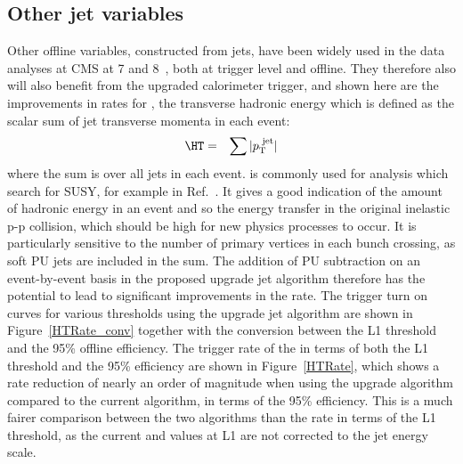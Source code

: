 \subsection{Other jet variables}
Other offline variables, constructed from jets, have been widely used in the data analyses at \ac{CMS} at 7 and 8~\TeV, both at trigger level and offline.
They therefore also will also benefit from the upgraded calorimeter trigger, and shown here are the improvements in rates for \HT, the transverse hadronic energy which is defined as the scalar sum of jet transverse momenta in each event:
%
\begin{eqnarray}
\HT &=& \sum{|\pt^{\text{ jet}}|} %
\end{eqnarray}  
where the sum is over all jets in each event.
\HT is commonly used for analysis which search for \ac{SUSY}, for example in Ref.~\cite{alphaT}.
It gives a good indication of the amount of hadronic energy in an event and so the energy transfer in the original inelastic p-p collision, which should be high for new physics processes to occur.
It is particularly sensitive to the number of primary vertices in each bunch crossing, as soft \ac{PU} jets are included in the sum.
The addition of \ac{PU} subtraction on an event-by-event basis in the proposed upgrade jet algorithm therefore has the potential to lead to significant improvements in the rate.
The trigger turn on curves for various \HT thresholds using the upgrade jet algorithm are shown in Figure~\ref{HTRate_conv} together with the conversion between the \ac{L1} threshold and the 95\% offline efficiency. 
The trigger rate of the \HT in terms of both the \ac{L1} threshold and the 95\% efficiency are shown in Figure~\ref{HTRate}, which shows a rate reduction of nearly an order of magnitude when using the upgrade algorithm compared to the current algorithm, in terms of the 95\% efficiency. 
This is a much fairer comparison between the two algorithms than the rate in terms of the \ac{L1} threshold, as the current \HT and \MHT values at \ac{L1} are not corrected to the jet energy scale.


